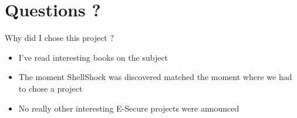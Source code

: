 \documentclass[11pt]{beamer}
\begin{document}
\section{Questions ?}

\begin{frame}{Why did I chose this project ?}
\begin{itemize}
\item I've read interesting books on the subject
\item The moment ShellShock was discovered matched the moment where we had to chose a project
\item No really other interesting E-Secure projects were announced
\end{itemize}
\end{frame}
\end{document}
